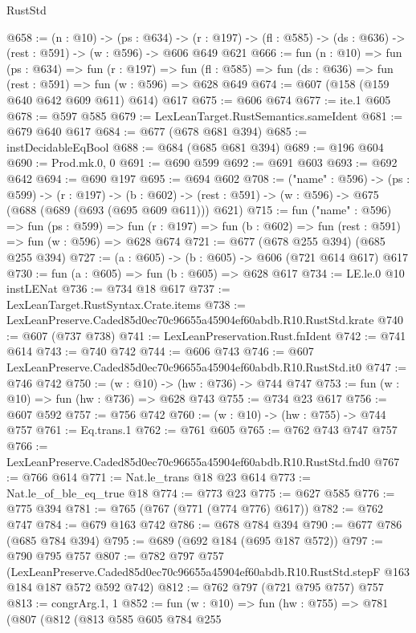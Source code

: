\begin{lexlean}{RustStd}
\begin{coremodule}
@658 := (n : @10) ->
  (ps : @634) ->
  (r : @197) -> (fl : @585) -> (ds : @636) -> (rest : @591) -> (w : @596) -> @606 @649 @621
@666 := fun (n : @10) =>
  fun (ps : @634) =>
  fun (r : @197) =>
  fun (fl : @585) => fun (ds : @636) => fun (rest : @591) => fun (w : @596) => @628 @649
@674 := @607 (@158 (@159 @640 @642 @609 @611) @614) @617
@675 := @606 @674
@677 := ite.{1} @605
@678 := @597 @585
@679 := LexLeanTarget.RustSemantics.sameIdent
@681 := @679 @640 @617
@684 := @677 (@678 @681 @394)
@685 := instDecidableEqBool
@688 := @684 (@685 @681 @394)
@689 := @196 @604
@690 := Prod.mk.{0, 0}
@691 := @690 @599
@692 := @691 @603
@693 := @692 @642
@694 := @690 @197
@695 := @694 @602
@708 := ("name" : @596) ->
  (ps : @599) ->
  (r : @197) ->
  (b : @602) -> (rest : @591) -> (w : @596) -> @675 (@688 (@689 (@693 (@695 @609 @611))) @621)
@715 := fun ("name" : @596) =>
  fun (ps : @599) =>
  fun (r : @197) => fun (b : @602) => fun (rest : @591) => fun (w : @596) => @628 @674
@721 := @677 (@678 @255 @394) (@685 @255 @394)
@727 := (a : @605) -> (b : @605) -> @606 (@721 @614 @617) @617
@730 := fun (a : @605) => fun (b : @605) => @628 @617
@734 := LE.le.{0} @10 instLENat
@736 := @734 @18 @617
@737 := LexLeanTarget.RustSyntax.Crate.items
@738 := LexLeanPreserve.Caded85d0ec70c96655a45904ef60abdb.R10.RustStd.krate
@740 := @607 (@737 @738)
@741 := LexLeanPreservation.Rust.fnIdent
@742 := @741 @614
@743 := @740 @742
@744 := @606 @743
@746 := @607 LexLeanPreserve.Caded85d0ec70c96655a45904ef60abdb.R10.RustStd.it0
@747 := @746 @742
@750 := (w : @10) -> (hw : @736) -> @744 @747
@753 := fun (w : @10) => fun (hw : @736) => @628 @743
@755 := @734 @23 @617
@756 := @607 @592
@757 := @756 @742
@760 := (w : @10) -> (hw : @755) -> @744 @757
@761 := Eq.trans.{1}
@762 := @761 @605
@765 := @762 @743 @747 @757
@766 := LexLeanPreserve.Caded85d0ec70c96655a45904ef60abdb.R10.RustStd.fnd0
@767 := @766 @614
@771 := Nat.le_trans @18 @23 @614
@773 := Nat.le_of_ble_eq_true @18
@774 := @773 @23
@775 := @627 @585
@776 := @775 @394
@781 := @765 (@767 (@771 (@774 @776) @617))
@782 := @762 @747
@784 := @679 @163 @742
@786 := @678 @784 @394
@790 := @677 @786 (@685 @784 @394)
@795 := @689 (@692 @184 (@695 @187 @572))
@797 := @790 @795 @757
@807 := @782
    @797
    @757
    (LexLeanPreserve.Caded85d0ec70c96655a45904ef60abdb.R10.RustStd.stepF
      @163
      @184
      @187
      @572
      @592
      @742)
@812 := @762 @797 (@721 @795 @757) @757
@813 := congrArg.{1, 1}
@852 := fun (w : @10) =>
  fun (hw : @755) =>
  @781
    (@807
      (@812
        (@813
          @585
          @605
          @784
          @255

\end{coremodule}
\end{lexlean}
